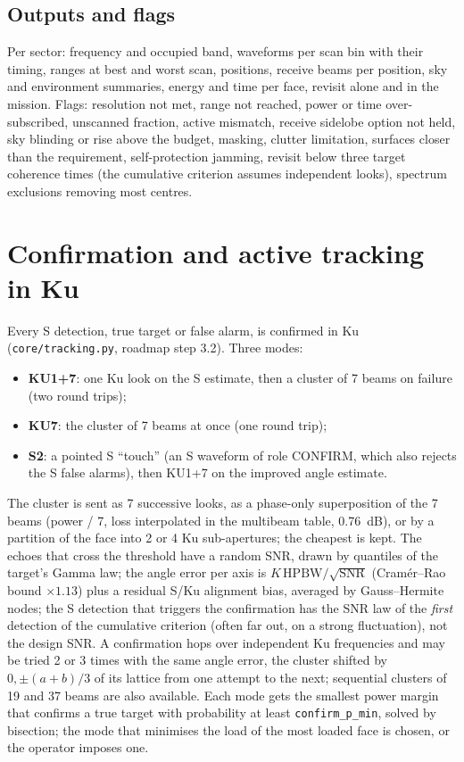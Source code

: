 \documentclass[11pt,a4paper]{article}
\newcommand{\code}[1]{\texttt{\small #1}}
\begin{document}
\subsection{Outputs and flags}
Per sector: frequency and occupied band, waveforms per scan bin with their timing, ranges at best and worst scan,
positions, receive beams per position, sky and environment summaries, energy and time per face, revisit alone and in
the mission. Flags: resolution not met, range not reached, power or time over-subscribed, unscanned fraction,
active mismatch, receive sidelobe option not held, sky blinding or rise above the budget, masking, clutter limitation,
surfaces closer than the requirement, self-protection jamming, revisit below three target coherence times (the
cumulative criterion assumes independent looks), spectrum exclusions removing most centres.

\section{Confirmation and active tracking in Ku}\label{sec:ku}
Every S detection, true target or false alarm, is confirmed in Ku (\code{core/tracking.py}, roadmap step 3.2). Three modes:
\begin{itemize}
  \item \textbf{KU1+7}: one Ku look on the S estimate, then a cluster of 7 beams on failure (two round trips);
  \item \textbf{KU7}: the cluster of 7 beams at once (one round trip);
  \item \textbf{S2}: a pointed S ``touch'' (an S waveform of role CONFIRM, which also rejects the S false alarms),
  then KU1+7 on the improved angle estimate.
\end{itemize}
The cluster is sent as 7 successive looks, as a phase-only superposition of the 7 beams (power / 7, loss interpolated
in the multibeam table, \SI{0.76}{dB}), or by a partition of the face into 2 or 4 Ku sub-apertures; the cheapest is
kept. The echoes that cross the threshold have a random SNR, drawn by quantiles of the target's Gamma law; the angle
error per axis is $K\,\mathrm{HPBW}/\sqrt{\mathrm{SNR}}$ (Cram\'er--Rao bound $\times 1.13$) plus a residual S/Ku
alignment bias, averaged by Gauss--Hermite nodes; the S detection that triggers the confirmation has the SNR law of
the \emph{first} detection of the cumulative criterion (often far out, on a strong fluctuation), not the design SNR.
A confirmation hops over independent Ku frequencies and may be tried 2 or 3 times with the same angle error, the
cluster shifted by $0, \pm(a+b)/3$ of its lattice from one attempt to the next; sequential clusters of 19 and 37
beams are also available. Each mode gets the smallest power margin that confirms a true target with probability at
least \code{confirm\_p\_min}, solved by bisection; the mode that minimises the load of the most loaded face is chosen,
or the operator imposes one.
\end{document}
